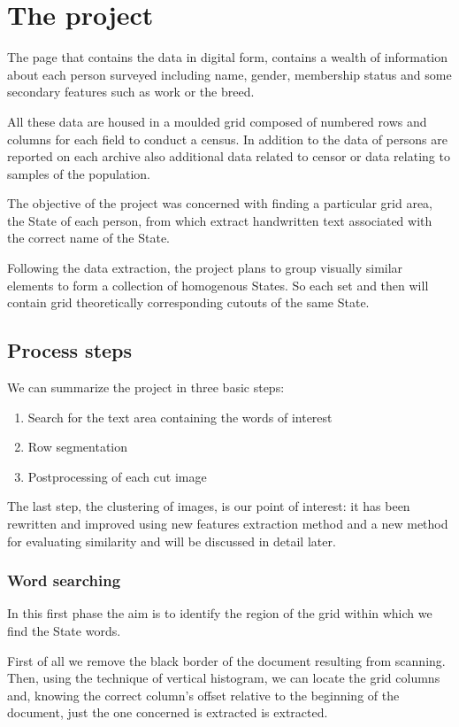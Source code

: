 \section{The project}

The page that contains the data in digital form, contains a wealth of information about each person surveyed including name, gender, membership status and some secondary features such as work or the breed. 

All these data are housed in a moulded grid composed of numbered rows and columns for each field to conduct a census. In addition to the data of persons are reported on each archive also additional data related to censor or data relating to samples of the population.

The objective of the project was concerned with finding a particular grid area, the State of each person, from which extract handwritten text associated with the correct name of the State.

Following the data extraction, the project plans to group visually similar elements to form a collection of homogenous States. So each set and then will contain grid theoretically corresponding cutouts of the same State.

\subsection{Process steps}

We can summarize the project in three basic steps:
\begin{enumerate}
\item Search for the text area containing the words of interest
\item Row segmentation
\item Postprocessing of each cut image
\end{enumerate}

The last step, the clustering of images, is our point of interest: it has been rewritten and improved using new features extraction method and a new method for evaluating similarity and will be discussed in detail later.

\subsubsection{Word searching}

In this first phase the aim is to identify the region of the grid within which we find the State words. 

First of all we remove the black border of the document resulting from scanning. Then, using the technique of vertical histogram, we can locate the grid columns and, knowing the correct column's offset relative to the beginning of the document, just the one concerned is extracted is extracted.

